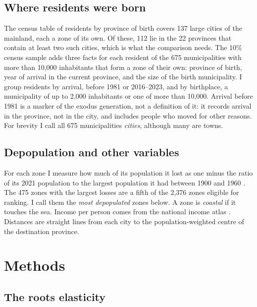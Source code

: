 \documentclass[pdflatex,sn-mathphys-num,referee]{sn-jnl}
\begin{document}
\subsection{Where residents were born}

The census table of residents by province of birth \cite{ine2026table68545} covers 137 large cities of the mainland, each a zone of its own. Of these, 112 lie in the 22 provinces that contain at least two such cities, which is what the comparison needs. The 10\% census sample \cite{ine2025censo} adds three facts for each resident of the 675 municipalities with more than 10,000 inhabitants that form a zone of their own: province of birth, year of arrival in the current province, and the size of the birth municipality. I group residents by arrival, before 1981 or 2016--2023, and by birthplace, a municipality of up to 2,000 inhabitants or one of more than 10,000. Arrival before 1981 is a marker of the exodus generation, not a definition of it: it records arrival in the province, not in the city, and includes people who moved for other reasons. For brevity I call all 675 municipalities \emph{cities}, although many are towns.

\subsection{Depopulation and other variables}

For each zone I measure how much of its population it lost as one minus the ratio of its 2021 population to the largest population it had between 1900 and 1960 \cite{ine2026intercensal}. The 475 zones with the largest losses are a fifth of the 2,376 zones eligible for ranking. I call them the \emph{most depopulated} zones below. A zone is \emph{coastal} if it touches the sea. Income per person comes from the national income atlas \cite{ine2026adrh}. Distances are straight lines from each city to the population-weighted centre of the destination province.

\section{Methods}\label{sec:methods}

\subsection{The roots elasticity}
\end{document}
